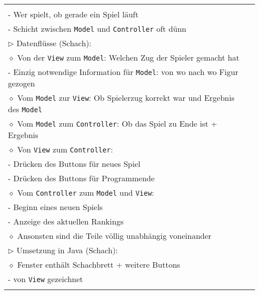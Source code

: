 \begin{longtable}{ | p{} p{} | }
{	\hspace{0.4cm} $\diamond$ \texttt{Controller}: \\
	\hspace{0.6cm} - Wer spielt, ob gerade ein Spiel läuft \\
	\hspace{0.6cm} - Schicht zwischen \texttt{Model} und \texttt{Controller} oft dünn \\
	$\rhd$ Datenflüsse (Schach): \\
	\hspace{0.4cm} $\diamond$ Von der \texttt{View} zum \texttt{Model}: Welchen Zug der Spieler gemacht hat \\
	\hspace{0.6cm} - Einzig notwendige Information für \texttt{Model}: von wo nach wo Figur gezogen \\
	\hspace{0.4cm} $\diamond$ Vom \texttt{Model} zur \texttt{View}: Ob Spielerzug korrekt war und Ergebnis des \texttt{Model} \\
	\hspace{0.4cm} $\diamond$ Vom \texttt{Model} zum \texttt{Controller}: Ob das Spiel zu Ende ist + Ergebnis \\
	\hspace{0.4cm} $\diamond$ Von \texttt{View} zum \texttt{Controller}: \\
	\hspace{0.6cm} - Drücken des Buttons für neues Spiel \\
	\hspace{0.6cm} - Drücken des Buttons für Programmende \\
	\hspace{0.4cm} $\diamond$ Vom \texttt{Controller} zum \texttt{Model} und \texttt{View}: \\
	\hspace{0.6cm} - Beginn eines neuen Spiels \\
	\hspace{0.6cm} - Anzeige des aktuellen Rankings \\
	\hspace{0.4cm} $\diamond$ Ansonsten sind die Teile völlig unabhängig voneinander \\
	$\rhd$ Umsetzung in Java (Schach): \\ 
	\hspace{0.4cm} $\diamond$ Fenster enthält Schachbrett + weitere Buttons \\
	\hspace{0.6cm} - von \texttt{View} gezeichnet \\
}
\end{longtable}
